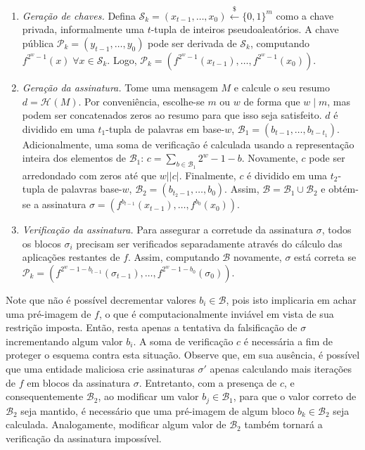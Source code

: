 \documentclass[12pt,notitlepage]{report}
\newcommand{\pk}{\mathcal{P}_k}
\newcommand{\sk}{\mathcal{S}_k}
\newcommand{\hash}[2][]{\mathcal{H}^{#1}(#2)}
\newcommand{\binwds}[1]{\{0, 1\}^{#1}}
\newcommand{\length}[1]{\vert #1 \vert}
\begin{document}
\begin{enumerate}

  \item[] \emph{Geração de chaves.} Defina $\sk{} = (x_{t-1}, \dots, x_0)
      \stackrel{\$}{\longleftarrow} \binwds{m}$ como a chave privada,
        informalmente uma $t$-tupla de inteiros pseudoaleatórios. A chave
        pública $\pk{} = (y_{t-1}, \dots, y_0)$ pode ser derivada de $\sk{}$,
        computando $f^{2^{w}-1}(x) \; \forall x \in  \sk{}$. Logo, $\pk{} =
        (f^{2^{w}-1}(x_{t-1}), \dots, f^{2^{w}-1}(x_0))$.

  \item[] \emph{Geração da assinatura.} Tome uma mensagem $M$ e calcule o seu
      resumo $d = \hash{M}$. Por conveniência, escolhe-se $m$ ou $w$ de forma
        que $w \mid m$, mas podem ser concatenados zeros ao resumo para que
        isso seja satisfeito. $d$ é dividido em uma $t_1$-tupla de palavras em
        base-$w$, $\mathcal{B}_1 = (b_{t-1}, \dots, b_{t-t_1})$.
        Adicionalmente, uma soma de verificação é calculada usando a
        representação inteira dos elementos de $\mathcal{B}_1$: $c = \sum_{b
        \in \mathcal{B}_1} 2^w - 1 - b$. Novamente, $c$ pode ser arredondado
        com zeros até que $w \mid \length{c}$. Finalmente, $c$ é dividido em
        uma $t_2$-tupla de palavras base-$w$, $\mathcal{B}_2 = (b_{t_2-1},
        \dots, b_0)$. Assim, $\mathcal{B} = \mathcal{B}_1 \cup \mathcal{B}_2$ e
        obtém-se a assinatura $\sigma = (f^{b_{t-1}}(x_{t-1}), \dots,
        f^{b_0}(x_0)).$

  \item[] \emph{Verificação da assinatura.} Para assegurar a corretude da
      assinatura $\sigma$, todos os blocos $\sigma_i$ precisam ser verificados
        separadamente através do cálculo das aplicações restantes de $f$.
        Assim, computando $\mathcal{B}$ novamente, $\sigma$ está correta se
        $\pk{} = (f^{2^w - 1 - b_{t-1}}(\sigma_{t-1}), \dots, f^{2^w - 1 -
        b_0}(\sigma_0))$.

\end{enumerate}

Note que não é possível decrementar valores $b_i \in \mathcal{B}$, pois isto
implicaria em achar uma pré-imagem de $f$, o que é computacionalmente inviável
em vista de sua restrição imposta. Então, resta apenas a tentativa da falsificação
de $\sigma$ incrementando algum valor $b_i$. A soma de verificação $c$ é
necessária a fim de proteger o esquema contra esta situação. Observe que,
em sua ausência, é possível que uma entidade maliciosa crie assinaturas
$\sigma'$ apenas calculando mais iterações de $f$ em blocos da assinatura
$\sigma$. Entretanto, com a presença de $c$, e consequentemente
$\mathcal{B}_2$, ao modificar um valor $b_j \in \mathcal{B}_1$, para que o
valor correto de $\mathcal{B}_2$ seja mantido, é necessário que uma pré-imagem
de algum bloco $b_k \in \mathcal{B}_2$ seja calculada. Analogamente, modificar
algum valor de $\mathcal{B}_2$ também tornará a verificação da assinatura
impossível.
\end{document}
